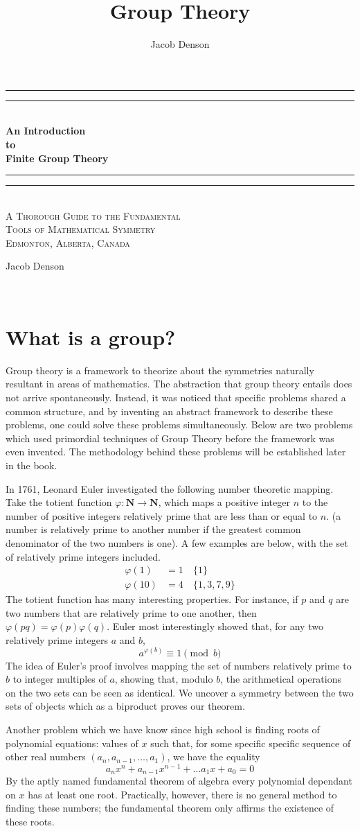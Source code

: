 \documentclass[12pt]{amsbook}
\title{Group Theory}
\author{Jacob Denson}
\theoremstyle{definition}
\newcommand*{\plogo}{\fbox{$\mathcal{PL}$}} %
\newcommand*{\titleGP}{\begingroup %
\centering %
\vspace*{\baselineskip} %

\rule{\textwidth}{1.6pt}\vspace*{-\baselineskip}\vspace*{2pt} %
\rule{\textwidth}{0.4pt}\\[\baselineskip] %

{\bf \Huge An Introduction\\ to \\[0.3\baselineskip] Finite Group Theory}\\[0.2\baselineskip] %

\rule{\textwidth}{0.4pt}\vspace*{-\baselineskip}\vspace{3.2pt} %
\rule{\textwidth}{1.6pt}\\[\baselineskip] %

\scshape %
\Large
A Thorough Guide to the Fundamental\\
Tools of Mathematical Symmetry\\[\baselineskip] %

\large Edmonton, Alberta, Canada\par %

\vspace*{2\baselineskip} %

{\Huge Jacob Denson\par} %

\vfill %

{\scshape \the\year} \\[0.3\baselineskip] %

\endgroup}
\begin{document}

\titleGP %

\tableofcontents


\chapter{What is a group?}

Group theory is a framework to theorize about the symmetries naturally resultant in areas of mathematics. The abstraction that group theory entails does not arrive spontaneously. Instead, it was noticed that specific problems shared a common structure, and by inventing an abstract framework to describe these problems, one could solve these problems simultaneously. Below are two problems which used primordial techniques of Group Theory before the framework was even invented. The methodology behind these problems will be established later in the book.

In 1761, Leonard Euler investigated the following number theoretic mapping. Take the totient function $\varphi:\mathbf{N} \to \mathbf{N}$, which maps a positive integer $n$ to the number of positive integers relatively prime that are less than or equal to $n$. (a number is relatively prime to another number if the greatest common denominator of the two numbers is one). A few examples are below, with the set of relatively prime integers included.
%
\begin{align*}
    \varphi(1) &= 1\ &\{1\}\\
    \varphi(10) &= 4\ &\{1,3,7,9\}
\end{align*}
%
The totient function has many interesting properties. For instance, if $p$ and $q$ are two numbers that are relatively prime to one another, then $\varphi(pq) = \varphi(p)\varphi(q)$. Euler most interestingly showed that, for any two relatively prime integers $a$ and $b$,
%
\[ a^{\varphi(b)} \equiv 1 \pmod{b} \]
%
The idea of Euler's proof involves mapping the set of numbers relatively prime to $b$ to integer multiples of $a$, showing that, modulo $b$, the arithmetical operations on the two sets can be seen as identical. We uncover a symmetry between the two sets of objects which as a biproduct proves our theorem.

Another problem which we have know since high school is finding roots of polynomial equations: values of $x$ such that, for some specific specific sequence of other real numbers $(a_n,a_{n-1},\dots,a_1)$, we have the equality
%
\[ a_nx^n + a_{n-1}x^{n-1} + \dots a_1x + a_0 = 0 \]
%
By the aptly named fundamental theorem of algebra every polynomial dependant on $x$ has at least one root. Practically, however, there is no general method to finding these numbers; the fundamental theorem only affirms the existence of these roots.
\end{document}
